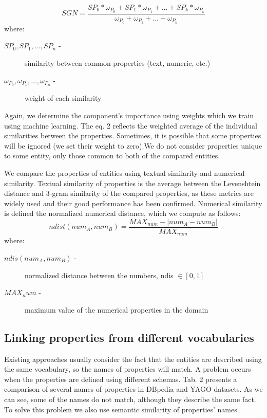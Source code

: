 \documentclass{llncs}
\begin{document}
$$ SGN = \frac{SP_0 * \omega_{P_0} + SP_1 * \omega_{P_1} + ... + SP_k * \omega_{P_k}}{\omega_{P_0} + \omega_{P_1} + ... + \omega_{P_k}} $$
where:

\begin{description}
\item[$SP_0, SP_1, ... , SP_n$ - ]similarity between common properties (text, numeric, etc.)
\item[$\omega_{P_0} , \omega_{P_1} , ... , \omega_{P_n}$ - ]weight of each similarity
\end{description}

Again, we determine the component's importance using weights which we train
using machine learning. The eq. 2 reflects the weighted average of the individual
similarities between the properties. Sometimes, it is possible that some properties
will be ignored (we set their weight to zero).We do not consider properties unique
to some entity, only those common to both of the compared entities.

We compare the properties of entities using textual similarity and numerical
similarity. Textual similarity of properties is the average between the Levenshtein
distance and 3-gram similarity of the compared properties, as these metrics
are widely used and their good performance has been confirmed. Numerical
similarity is defined the normalized numerical distance, which we compute as
follows:
$$ ndist(num_A, num_B) = \frac{MAX_{num} - | num_A - num_B|}{MAX_{num}} $$
where:

\begin{description}
\item[$ ndis(num_A, num_B) $ - ]normalized distance between the numbers, ndis $\in [0,1]$
\item[$ MAX_num $ - ]maximum value of the numerical properties in the domain
\end{description}

\subsection*{Linking properties from different vocabularies}


Existing approaches usually consider the fact that the entities are described
using the same vocabulary, so the names of properties will match. A problem
occurs when the properties are defined using different schemas. Tab. 2 presents
a comparison of several names of properties in DBpedia and YAGO datasets. As
we can see, some of the names do not match, although they describe the same
fact. To solve this problem we also use semantic similarity of properties' names.
\end{document}

